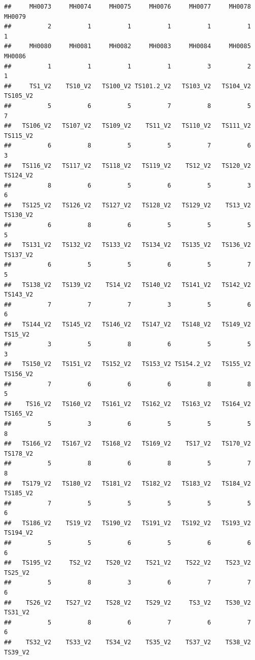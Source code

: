 \documentclass[
]{book}
\begin{document}
\begin{verbatim}
##     MH0073     MH0074     MH0075     MH0076     MH0077     MH0078     MH0079 
##          2          1          1          1          1          1          1 
##     MH0080     MH0081     MH0082     MH0083     MH0084     MH0085     MH0086 
##          1          1          1          1          3          2          1 
##     TS1_V2    TS10_V2   TS100_V2 TS101.2_V2   TS103_V2   TS104_V2   TS105_V2 
##          5          6          5          7          8          5          7 
##   TS106_V2   TS107_V2   TS109_V2    TS11_V2   TS110_V2   TS111_V2   TS115_V2 
##          6          8          5          5          7          6          3 
##   TS116_V2   TS117_V2   TS118_V2   TS119_V2    TS12_V2   TS120_V2   TS124_V2 
##          8          6          5          6          5          3          6 
##   TS125_V2   TS126_V2   TS127_V2   TS128_V2   TS129_V2    TS13_V2   TS130_V2 
##          6          8          6          5          5          5          5 
##   TS131_V2   TS132_V2   TS133_V2   TS134_V2   TS135_V2   TS136_V2   TS137_V2 
##          6          5          5          6          5          7          5 
##   TS138_V2   TS139_V2    TS14_V2   TS140_V2   TS141_V2   TS142_V2   TS143_V2 
##          7          7          7          3          5          6          6 
##   TS144_V2   TS145_V2   TS146_V2   TS147_V2   TS148_V2   TS149_V2    TS15_V2 
##          3          5          8          6          5          5          3 
##   TS150_V2   TS151_V2   TS152_V2   TS153_V2 TS154.2_V2   TS155_V2   TS156_V2 
##          7          6          6          6          8          8          5 
##    TS16_V2   TS160_V2   TS161_V2   TS162_V2   TS163_V2   TS164_V2   TS165_V2 
##          5          3          6          5          5          5          8 
##   TS166_V2   TS167_V2   TS168_V2   TS169_V2    TS17_V2   TS170_V2   TS178_V2 
##          5          8          6          8          5          7          8 
##   TS179_V2   TS180_V2   TS181_V2   TS182_V2   TS183_V2   TS184_V2   TS185_V2 
##          7          5          5          5          5          5          6 
##   TS186_V2    TS19_V2   TS190_V2   TS191_V2   TS192_V2   TS193_V2   TS194_V2 
##          5          5          6          5          6          6          6 
##   TS195_V2     TS2_V2    TS20_V2    TS21_V2    TS22_V2    TS23_V2    TS25_V2 
##          5          8          3          6          7          7          6 
##    TS26_V2    TS27_V2    TS28_V2    TS29_V2     TS3_V2    TS30_V2    TS31_V2 
##          5          8          6          7          6          7          6 
##    TS32_V2    TS33_V2    TS34_V2    TS35_V2    TS37_V2    TS38_V2    TS39_V2 

\end{verbatim}
\end{document}
